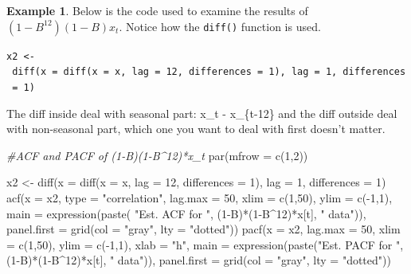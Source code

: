 \documentclass[
]{book}
\newenvironment{Shaded}{\begin{snugshade}}{\end{snugshade}}
\newcommand{\AttributeTok}[1]{\textcolor[rgb]{0.77,0.63,0.00}{#1}}
\newcommand{\CommentTok}[1]{\textcolor[rgb]{0.56,0.35,0.01}{\textit{#1}}}
\newcommand{\DecValTok}[1]{\textcolor[rgb]{0.00,0.00,0.81}{#1}}
\newcommand{\FunctionTok}[1]{\textcolor[rgb]{0.00,0.00,0.00}{#1}}
\newcommand{\NormalTok}[1]{#1}
\newcommand{\OtherTok}[1]{\textcolor[rgb]{0.56,0.35,0.01}{#1}}
\newcommand{\SpecialCharTok}[1]{\textcolor[rgb]{0.00,0.00,0.00}{#1}}
\newcommand{\StringTok}[1]{\textcolor[rgb]{0.31,0.60,0.02}{#1}}
\theoremstyle{definition}
\theoremstyle{definition}
\newtheorem{example}{Example}[chapter]
\theoremstyle{definition}
\theoremstyle{definition}
\theoremstyle{remark}
\begin{document}
\begin{example}
Below is the code used to examine the results of \((1-B^{12})(1-B)x_t\). Notice how the \texttt{diff()} function is used.

\texttt{x2\ \textless{}-\ diff(x\ =\ diff(x\ =\ x,\ lag\ =\ 12,\ differences\ =\ 1),\ lag\ =\ 1,\ differences\ =\ 1)}

The diff inside deal with seasonal part: x\_t - x\_\{t-12\} and the diff outside deal with non-seasonal part, which one you want to deal with first doesn't matter.

\begin{Shaded}
\begin{Highlighting}[]
\CommentTok{\#ACF and PACF of (1{-}B)(1{-}B\^{}12)*x\_t}
\FunctionTok{par}\NormalTok{(}\AttributeTok{mfrow =} \FunctionTok{c}\NormalTok{(}\DecValTok{1}\NormalTok{,}\DecValTok{2}\NormalTok{))}

\NormalTok{x2 }\OtherTok{\textless{}{-}} \FunctionTok{diff}\NormalTok{(}\AttributeTok{x =} \FunctionTok{diff}\NormalTok{(}\AttributeTok{x =}\NormalTok{ x, }\AttributeTok{lag =} \DecValTok{12}\NormalTok{, }\AttributeTok{differences =} \DecValTok{1}\NormalTok{), }
    \AttributeTok{lag =} \DecValTok{1}\NormalTok{, }\AttributeTok{differences =} \DecValTok{1}\NormalTok{)}
\FunctionTok{acf}\NormalTok{(}\AttributeTok{x =}\NormalTok{ x2, }\AttributeTok{type =} \StringTok{"correlation"}\NormalTok{, }\AttributeTok{lag.max =} \DecValTok{50}\NormalTok{, }\AttributeTok{xlim =} 
    \FunctionTok{c}\NormalTok{(}\DecValTok{1}\NormalTok{,}\DecValTok{50}\NormalTok{), }\AttributeTok{ylim =} \FunctionTok{c}\NormalTok{(}\SpecialCharTok{{-}}\DecValTok{1}\NormalTok{,}\DecValTok{1}\NormalTok{), }\AttributeTok{main =} \FunctionTok{expression}\NormalTok{(}\FunctionTok{paste}\NormalTok{( }
    \StringTok{"Est. ACF for "}\NormalTok{, (}\DecValTok{1}\SpecialCharTok{{-}}\NormalTok{B)}\SpecialCharTok{*}\NormalTok{(}\DecValTok{1}\SpecialCharTok{{-}}\NormalTok{B}\SpecialCharTok{\^{}}\DecValTok{12}\NormalTok{)}\SpecialCharTok{*}\NormalTok{x[t], }\StringTok{" data"}\NormalTok{)), }
    \AttributeTok{panel.first =} \FunctionTok{grid}\NormalTok{(}\AttributeTok{col =} \StringTok{"gray"}\NormalTok{, }\AttributeTok{lty =} \StringTok{"dotted"}\NormalTok{))}
\FunctionTok{pacf}\NormalTok{(}\AttributeTok{x =}\NormalTok{ x2, }\AttributeTok{lag.max =} \DecValTok{50}\NormalTok{, }\AttributeTok{xlim =} \FunctionTok{c}\NormalTok{(}\DecValTok{1}\NormalTok{,}\DecValTok{50}\NormalTok{), }\AttributeTok{ylim =} 
    \FunctionTok{c}\NormalTok{(}\SpecialCharTok{{-}}\DecValTok{1}\NormalTok{,}\DecValTok{1}\NormalTok{), }\AttributeTok{xlab =} \StringTok{"h"}\NormalTok{, }\AttributeTok{main =} \FunctionTok{expression}\NormalTok{(}\FunctionTok{paste}\NormalTok{(}\StringTok{"Est. }
\StringTok{    PACF for "}\NormalTok{, (}\DecValTok{1}\SpecialCharTok{{-}}\NormalTok{B)}\SpecialCharTok{*}\NormalTok{(}\DecValTok{1}\SpecialCharTok{{-}}\NormalTok{B}\SpecialCharTok{\^{}}\DecValTok{12}\NormalTok{)}\SpecialCharTok{*}\NormalTok{x[t], }\StringTok{" data"}\NormalTok{)), }
    \AttributeTok{panel.first =} \FunctionTok{grid}\NormalTok{(}\AttributeTok{col =} \StringTok{"gray"}\NormalTok{, }\AttributeTok{lty =} \StringTok{"dotted"}\NormalTok{))}
\end{Highlighting}
\end{Shaded}


\end{example}
\end{document}
